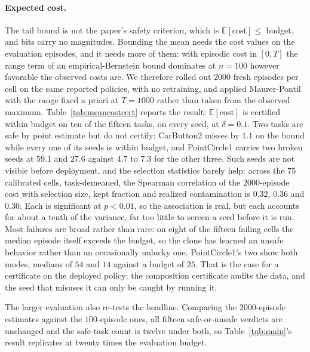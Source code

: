 \documentclass{article} %
\begin{document}
\paragraph{Expected cost.} The tail bound is not the paper's safety criterion, which is
$\mathbb{E}[\text{cost}] \le$ budget, and bits carry no magnitudes. Bounding the mean
needs the cost values on the evaluation episodes, and it needs more of them: with
episodic cost in $[0, T]$ the range term of an empirical-Bernstein bound dominates at
$n = 100$ however favorable the observed costs are. We therefore rolled out $2000$
fresh episodes per cell on the same reported policies, with no retraining, and applied Maurer-Pontil with the range fixed
a priori at $T = 1000$ rather than taken from the observed
maximum. Table~\ref{tab:meancostcert} reports the result: $\mathbb{E}[\text{cost}]$ is
certified within budget on ten of the fifteen tasks, on every seed, at $\delta = 0.1$.
Two tasks are safe by point estimate but do not certify: CarButton2 misses by $1.1$ on
the bound while every one of its seeds is within budget, and PointCircle1 carries two
broken seeds at $59.1$ and $27.6$ against $4.7$ to $7.3$ for the other three. Such seeds
are not visible before deployment, and the selection statistics barely help: across the
$75$ calibrated cells, task-demeaned, the Spearman correlation of the $2000$-episode cost
with selection size, kept fraction and realized contamination is $0.32$, $0.36$ and
$0.30$. Each is significant at $p < 0.01$, so the association is real, but each accounts
for about a tenth of the variance, far too little to screen a seed before it is run.
Most failures are broad rather than rare: on eight of the fifteen failing cells the
median episode itself exceeds the budget, so the clone has learned an unsafe behavior
rather than an occasionally unlucky one. PointCircle1's two show both modes, medians of
$54$ and $14$ against a budget of $25$. That is the case for a
certificate on the deployed policy: the composition certificate audits the data, and
the seed that misuses it can only be caught by running it.

The larger evaluation also re-tests the headline. Comparing the $2000$-episode estimates
against the $100$-episode ones, all fifteen safe-or-unsafe verdicts are
unchanged and the safe-task count is twelve under both, so
Table~\ref{tab:main}'s result replicates at twenty times the evaluation budget.
\end{document}
